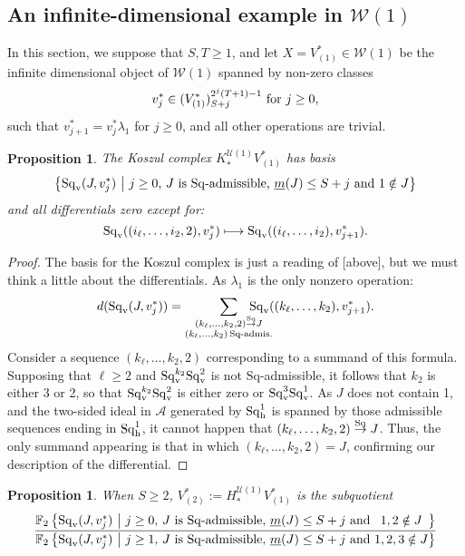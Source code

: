 \documentclass[11pt]{amsart}
\theoremstyle{plain}
\newtheorem{prop}[thm]{Proposition}
\theoremstyle{definition}
\newcommand{\calW}{\mathcal{W}}
\newcommand{\calU}{\mathcal{U}}
\newcommand{\calA}{\mathcal{A}}
\theoremstyle{plain}
\newcommand{\minDimSq}{\underline{m}}
\newcommand{\produces}[3]{#3:#1\sim #2}
\renewcommand{\produces}[3]{#1\rightarrow_{#3} #2}%
\renewcommand{\produces}[3]{#1\overset{\smash{#3}}{\rightarrow} #2}%
\newcommand{\Sq}{\mathrm{Sq}}
\newcommand{\Sqh}{\mathrm{Sq}_\textup{h}}
\newcommand{\Sqv}{\mathrm{Sq}_\textup{v}}
\newcommand{\LieSteen}{\calA}
\newcommand{\F}{\mathbb{F}}
\begin{document}
\begin{Calculations of HWn for n nonzero}
\subsection{An infinite-dimensional example in $\calW(1)$}
In this section, we suppose that $S,T\geq1$, and let $X=V^*_{(1)}\in\calW(1)$ be the infinite dimensional object of $\calW(1)$ spanned by non-zero classes
\[v_{j}^{*}\in (V^*_{(1)})^{2^{j}(T+1)-1}_{S+j}\textup{ for $j\geq 0$},\] such that $v_{j+1}^*=v^*_j\lambda_{1}$ for $j\geq 0$, and all other operations are trivial. %
\begin{prop}\label{calc of koszul complex in inf dim example}
The Koszul complex $K_*^{\calU(1)}V^*_{(1)}$ has basis
\[\left\{\Sq_{\textup{v}}(J,v_j^*)\ \middle|\ \textup{$j\geq0$, $J$ is $\Sq$-admissible, $\minDimSq(J)\leq S+j$ and $1\notin J$}\right\} \]
and all differentials zero except for:
\[\Sq_{\textup{v}}((i_\ell,\ldots,i_2,2),v^*_{j})\longmapsto \Sq_{\textup{v}}((i_\ell,\ldots,i_2),v^*_{j+1}).\]
\end{prop}
\begin{proof}
The basis for the Koszul complex is just a reading of [above], but we must think a little about the differentials. As $\lambda_1$ is the only nonzero operation:
\[d(\Sqv(J,v^*_j))=\sum_{ \substack{\produces{(k_{\ell},\ldots,k_2,2)}{J}{\Sq}\\(k_{\ell},\ldots,k_2){\,\Sq\textup{-admis.}}}}\!\!\!\!\!\!\!\!\!\!\!\! \Sqv((k_{\ell},\ldots,k_2),v_{j+1}^*).\]
Consider a sequence $(k_\ell,\ldots,k_2,2)$ corresponding to a summand of this formula. Supposing that $\ell\geq2$ and $\Sqv^{k_2}\Sqv^2$ is not $\Sq$-admissible, it follows that $k_2$ is either 3 or 2, so that $\Sqv^{k_2}\Sqv^2$ is either zero or $\Sqv^{3}\Sqv^1$. As $J$ does not contain 1, and the two-sided ideal in $\LieSteen$ generated by $\Sqh^1$ is spanned by those admissible sequences ending in $\Sqh^1$, it cannot happen that $\produces{(k_{\ell},\ldots,k_2,2)}{J}{\Sq}$. Thus, the only summand appearing is that in which $(k_{\ell},\ldots,k_2,2)=J$, confirming our description of the differential.
\end{proof}
\begin{prop}\label{Sg1 calc of V2}
When $S\geq2$, $V^*_{(2)}:=H_*^{\calU(1)}V^*_{(1)}$ is the subquotient
\[\frac{{\F_{2}\left\{\Sq_{\textup{v}}(J,v_j^*)\ \middle|\ \makebox[\widthof{$\textup{$j\geq0$}$}][c]{$\textup{$j\geq0$}$}\textup{, $J$ is $\Sq$-admissible, $\minDimSq(J)\leq S+j$ and}\makebox[\widthof{$\textup{ $1,2,3\notin J$}$}][c]{$\textup{ $1,2\notin J$}$}\right\}}}{{\F_{2}\left\{\Sq_{\textup{v}}(J,v_j^*)\ \middle|\ \makebox[\widthof{$\textup{$j\geq0$}$}][c]{$\textup{$j\geq1$}$}\textup{, $J$ is $\Sq$-admissible, $\minDimSq(J)\leq S+j$ and}\makebox[\widthof{$\textup{ $1,2,3\notin J$}$}][c]{$\textup{ $1,2,3\notin J$}$}\right\}}}\]

\end{prop}
\end{Calculations of HWn for n nonzero}
\end{document}
